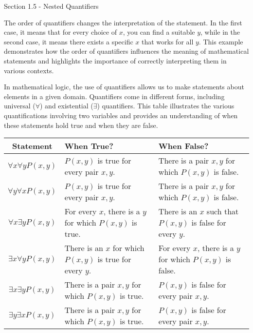 \begin{notes}{Section 1.5 - Nested Quantifiers}
\begin{highlight}
        The order of quantifiers changes the interpretation of the statement. In the first case, it means that for every choice of \(x\), you can find a suitable \(y\), while in the second case, it means there exists a specific \(x\) that works for all \(y\). 
        This example demonstrates how the order of quantifiers influences the meaning of mathematical statements and highlights the importance of correctly interpreting them in various contexts.
    \end{highlight}
    
    In mathematical logic, the use of quantifiers allows us to make statements about elements in a given domain. Quantifiers come in different forms, including universal (\(\forall\)) and existential (\(\exists\)) quantifiers. This table illustrates the various 
    quantifications involving two variables and provides an understanding of when these statements hold true and when they are false.

    \begin{center}
        \begin{tabular}{|c|p{6cm}|p{6cm}|}
            \hline \textbf{Statement} & \textbf{When True?} & \textbf{When False?} \\ \hline
            \(\forall x \forall y P(x, y)\) & \(P(x, y)\) is true for every pair \(x, y\). & There is a pair \(x, y\) for which \(P(x, y)\) is false. \\ \hline
            \(\forall y \forall x P(x, y)\) & \(P(x, y)\) is true for every pair \(x, y\). & There is a pair \(x, y\) for which \(P(x, y)\) is false. \\ \hline
            \(\forall x \exists y P(x, y)\) & For every \(x\), there is a \(y\) for which \(P(x, y)\) is true. & There is an \(x\) such that \(P(x, y)\) is false for every \(y\). \\ \hline
            \(\exists x \forall y P(x, y)\) & There is an \(x\) for which \(P(x, y)\) is true for every \(y\). & For every \(x\), there is a \(y\) for which \(P(x, y)\) is false. \\ \hline
            \(\exists x \exists y P(x, y)\) & There is a pair \(x, y\) for which \(P(x, y)\) is true. & \(P(x, y)\) is false for every pair \(x, y\). \\ \hline
            \(\exists y \exists x P(x, y)\) & There is a pair \(x, y\) for which \(P(x, y)\) is true. & \(P(x, y)\) is false for every pair \(x, y\). \\ \hline
        \end{tabular}
    \end{center}
    

\end{notes}
